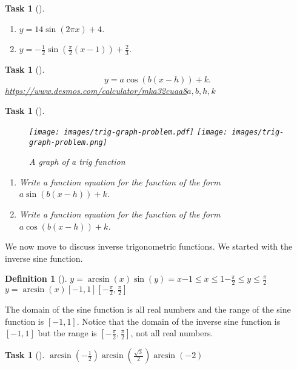\documentclass[10pt,]{article}
\theoremstyle{plain}
\newtheorem{proposition}[theorem]{Task}
\theoremstyle{definition}
\newtheorem{definition}[theorem]{Definition}
\numberwithin{equation}{section}
\begin{document}
\begin{proposition}[{}]\label{proposition-64}
\leavevmode%
\begin{enumerate}
\item\hypertarget{li-277}{}\(y=14\sin(2\pi x)+4\).%
\item\hypertarget{li-278}{}\(y=-\frac{1}{2}\sin(\frac{\pi}{2}(x-1))+\frac{2}{3}\).%
\end{enumerate}
\end{proposition}
\begin{proposition}[{}]\label{proposition-65}
%
\begin{equation*}
y=a\cos(b(x-h))+k.
\end{equation*}
\href{https://www.desmos.com/calculator/mka32cuaa8}{https://www.desmos.com/calculator/mka32cuaa8}\(a,b,h,k\)\end{proposition}
\begin{proposition}[{}]\label{proposition-66}
\leavevmode%
\begin{figure}
\centering
{}%
{\texttt{[image: images/trig-graph-problem.pdf]}}%
{\texttt{[image: images/trig-graph-problem.png]}}
\caption{A graph of a trig function\label{figure-10}}
\end{figure}
\leavevmode%
\begin{enumerate}
\item\hypertarget{li-279}{}Write a function equation for the function of the form \(a\sin(b(x-h))+k\).%
\item\hypertarget{li-280}{}Write a function equation for the function of the form \(a\cos(b(x-h))+k\).%
\end{enumerate}
\end{proposition}
\hypertarget{p-130}{}%
We now move to discuss inverse trigonometric functions. We started with the inverse sine function.%
\begin{definition}[{}]\label{definition-5}
\(y=\arcsin(x)\)\(\sin(y)=x\)\(-1 \leq x \leq 1\)\(-\frac{\pi}{2} \leq y \leq \frac{\pi}{2}\)\(y=\arcsin(x)\)\([-1,1]\)\([-\frac{\pi}{2},\frac{\pi}{2}]\)\end{definition}
\hypertarget{p-131}{}%
The domain of the sine function is all real numbers and the range of the sine function is \([-1,1]\). Notice that the domain of the inverse sine function is \([-1,1]\) but the range is \([-\frac{\pi}{2},\frac{\pi}{2}]\), not all real numbers.%
\begin{proposition}[{}]\label{proposition-67}
\(\arcsin(-\frac{1}{2})\)\(\arcsin(\frac{\sqrt{3}}{2})\)\(\arcsin(-2)\)\end{proposition}
\end{document}

